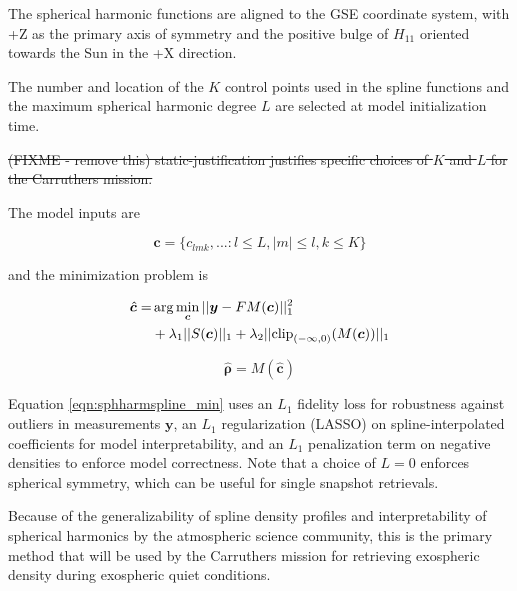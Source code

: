 \documentclass[pdflatex,twocolumn,sn-mathphys-num]{sn-jnl}
\newcommand{\st}[1]{{\color{red}\sout{#1}}}
\begin{document}
The spherical harmonic functions are aligned to the GSE coordinate system, with +Z as the primary axis of symmetry and the positive bulge of $H_{1 1}$ oriented towards the Sun in the +X direction.

The number and location of the $K$ control points used in the spline functions and the maximum spherical harmonic degree $L$ are selected at model initialization time.

\st{(FIXME - remove this) static-justification justifies specific choices of $K$ and $L$ for the Carruthers mission.}

The model inputs are

$$\bm{c} = \{c_{l m k}, ... : l \leq L, |m| \leq l, k  \leq K \}$$

and the minimization problem is

\begin{align}
    \hat{\bm{c}} =& \arg \min_{\bm{c}} ||\bm{y} - FM(\bm{c})||_1^2 \notag \\
    &+ \lambda_1 ||S(\bm{c})||_1 + \lambda_2 ||\text{clip}_{(-\infty, 0)}(M(\bm{c}))||_1
    \label{eqn:sphharmspline_min}
\end{align}

\begin{equation}
  \bm{\hat{\rho}} = M(\bm{\hat{c}})
\end{equation}

    Equation \ref{eqn:sphharmspline_min} uses an $L_1$ fidelity loss for robustness against outliers in measurements $\bm{y}$, an $L_1$ regularization (LASSO) on spline-interpolated coefficients for model interpretability, and an $L_1$ penalization term on negative densities to enforce model correctness.
    Note that a choice of $L=0$ enforces spherical symmetry, which can be useful for single snapshot retrievals.

    Because of the generalizability of spline density profiles and interpretability of spherical harmonics by the atmospheric science community, this is the primary method that will be used by the Carruthers mission for retrieving exospheric density during exospheric quiet conditions.




\end{document}
